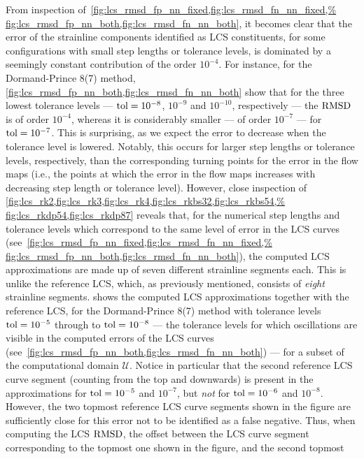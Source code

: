 From inspection of~\cref{fig:lcs_rmsd_fp_nn_fixed,fig:lcs_rmsd_fn_nn_fixed,%
fig:lcs_rmsd_fp_nn_both,fig:lcs_rmsd_fn_nn_both}, it becomes clear that the
error of the strainline components identified as LCS constituents, for some
configurations with small step lengths or tolerance levels, is dominated by
a seemingly constant contribution of the order $10^{-4}$. For instance,
for the Dormand-Prince 8(7) method,
\cref{fig:lcs_rmsd_fp_nn_both,fig:lcs_rmsd_fn_nn_both} show that for the three
lowest tolerance levels --- $\textnormal{tol}=10^{-8}$, $10^{-9}$ and
$10^{-10}$, respectively --- the $\operatorname{RMSD}$ is of order $10^{-4}$, whereas it is
considerably smaller --- of order $10^{-7}$ --- for $\textnormal{tol}=10^{-7}$.
This is surprising, as we expect the error to decrease when the tolerance level
is lowered.  Notably, this occurs for larger step lengths or tolerance levels,
respectively, than the corresponding turning points for the error in the flow
maps (i.e., the points at which the error in the flow maps increases with
decreasing step length or tolerance level). However, close inspection of
\cref{fig:lcs_rk2,fig:lcs_rk3,fig:lcs_rk4,fig:lcs_rkbs32,fig:lcs_rkbs54,%
fig:lcs_rkdp54,fig:lcs_rkdp87} reveals that, for the numerical step lengths
and tolerance levels which correspond to the same level of error in the LCS
curves (see~\cref{fig:lcs_rmsd_fp_nn_fixed,fig:lcs_rmsd_fn_nn_fixed,%
fig:lcs_rmsd_fp_nn_both,fig:lcs_rmsd_fn_nn_both}), the computed LCS
approximations are made up of seven different strainline segments each. This
is unlike the reference LCS, which, as previously mentioned, consists
of \emph{eight} strainline segments.
\clearpage
{} shows the computed LCS approximations together
with the reference LCS, for the Dormand-Prince 8(7) method with tolerance
levels $\textnormal{tol}=10^{-5}$ through to $\textnormal{tol}=10^{-8}$ ---
the tolerance levels for which oscillations are visible in the computed errors
of the LCS curves (see~\cref{fig:lcs_rmsd_fp_nn_both,fig:lcs_rmsd_fn_nn_both})
--- for a subset of the computational domain $\mathcal{U}$. Notice in
particular that the second reference LCS curve segment (counting from the top
and downwards) is present in the approximations for $\textnormal{tol}=10^{-5}$
and $10^{-7}$, but \emph{not} for $\textnormal{tol}=10^{-6}$ and $10^{-8}$.
However, the two topmost reference LCS curve segments shown in the figure
are sufficiently close for this error not to be identified as a false negative.
Thus, when computing the LCS $\operatorname{RMSD}$, the offset between the LCS curve segment
corresponding to the topmost one shown in the figure, and the second topmost
